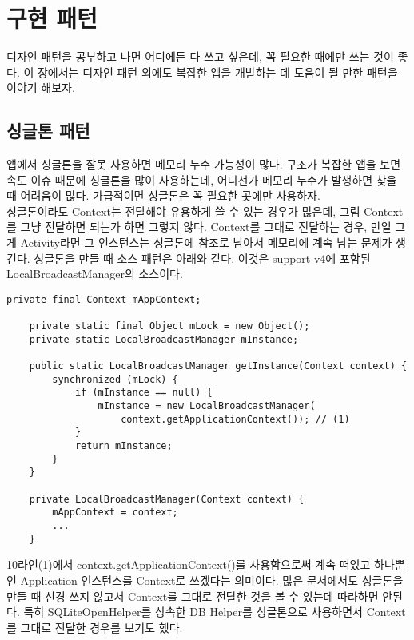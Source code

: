\chapter{구현 패턴}
디자인 패턴을 공부하고 나면 어디에든 다 쓰고 싶은데, 꼭 필요한 때에만 쓰는 것이 좋다.
이 장에서는 디자인 패턴 외에도 복잡한 앱을 개발하는 데 도움이 될 만한 패턴을 이야기 해보자.

\section{싱글톤 패턴}
\label{sec:singleton}
앱에서 싱글톤을 잘못 사용하면 메모리 누수 가능성이 많다. 
구조가 복잡한 앱을 보면 속도 이슈 때문에 싱글톤을 많이 사용하는데, 어디선가 메모리 누수가 발생하면 찾을 때 어려움이 많다. 
가급적이면 싱글톤은 꼭 필요한 곳에만 사용하자.\\

싱글톤이라도 Context는 전달해야 유용하게 쓸 수 있는 경우가 많은데, 그럼 Context를 그냥 전달하면 되는가 하면 그렇지 않다.
Context를 그대로 전달하는 경우, 만일 그게 Activity라면 그 인스턴스는 싱글톤에 참조로 남아서 메모리에 계속 남는 문제가 생긴다.
싱글톤을 만들 때 소스 패턴은 아래와 같다. 이것은 support-v4에 포함된 LocalBroadcastManager의 소스이다.
\begin{lstlisting}[frame=single, caption=LocalBroadcastManager.java]
    private final Context mAppContext;
	
    private static final Object mLock = new Object();
    private static LocalBroadcastManager mInstance;

    public static LocalBroadcastManager getInstance(Context context) {
        synchronized (mLock) {
            if (mInstance == null) {
                mInstance = new LocalBroadcastManager(
                	context.getApplicationContext()); // (1)
            }
            return mInstance;
        }
    }

    private LocalBroadcastManager(Context context) {
        mAppContext = context;
        ...
    }
\end{lstlisting} 
10라인(1)에서 context.getApplicationContext()를 사용함으로써 계속 떠있고 하나뿐인 Application 인스턴스를 Context로 쓰겠다는 의미이다.
많은 문서에서도 싱글톤을 만들 때 신경 쓰지 않고서 Context를 그대로 전달한 것을 볼 수 있는데 따라하면 안된다.
특히 SQLiteOpenHelper를 상속한 DB Helper를 싱글톤으로 사용하면서 Context를 그대로 전달한 경우를 보기도 했다.\\

